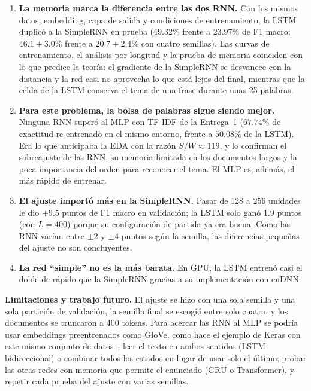 \documentclass[12pt, a4paper]{article}
\begin{document}
\begin{enumerate}
    \item \textbf{La memoria marca la diferencia entre las dos RNN.} Con los mismos datos, embedding, capa de salida y condiciones de entrenamiento, la LSTM duplicó a la SimpleRNN en prueba ($49.32\%$ frente a $23.97\%$ de F1 macro; $46.1 \pm 3.0\%$ frente a $20.7 \pm 2.4\%$ con cuatro semillas). Las curvas de entrenamiento, el análisis por longitud y la prueba de memoria coinciden con lo que predice la teoría: el gradiente de la SimpleRNN se desvanece con la distancia y la red casi no aprovecha lo que está lejos del final, mientras que la celda de la LSTM conserva el tema de una frase durante unas 25 palabras.
    \item \textbf{Para este problema, la bolsa de palabras sigue siendo mejor.} Ninguna RNN superó al MLP con TF-IDF de la Entrega~1 ($67.74\%$ de exactitud re-entrenado en el mismo entorno, frente a $50.08\%$ de la LSTM). Era lo que anticipaba la EDA con la razón $S/W \approx 119$, y lo confirman el sobreajuste de las RNN, su memoria limitada en los documentos largos y la poca importancia del orden para reconocer el tema. El MLP es, además, el más rápido de entrenar.
    \item \textbf{El ajuste importó más en la SimpleRNN.} Pasar de 128 a 256 unidades le dio +9.5 puntos de F1 macro en validación; la LSTM solo ganó 1.9 puntos (con $L=400$) porque su configuración de partida ya era buena. Como las RNN varían entre $\pm 2$ y $\pm 4$ puntos según la semilla, las diferencias pequeñas del ajuste no son concluyentes.
    \item \textbf{La red ``simple'' no es la más barata.} En GPU, la LSTM entrenó casi el doble de rápido que la SimpleRNN gracias a su implementación con cuDNN.
\end{enumerate}

\textbf{Limitaciones y trabajo futuro.} El ajuste se hizo con una sola semilla y una sola partición de validación, la semilla final se escogió entre solo cuatro, y los documentos se truncaron a 400 tokens. Para acercar las RNN al MLP se podría usar embeddings preentrenados como GloVe, como hace el ejemplo de Keras con este mismo conjunto de datos~\cite{kerasglove}; leer el texto en ambos sentidos (LSTM bidireccional) o combinar todos los estados en lugar de usar solo el último; probar las otras redes con memoria que permite el enunciado (GRU o Transformer), y repetir cada prueba del ajuste con varias semillas.
\end{document}
